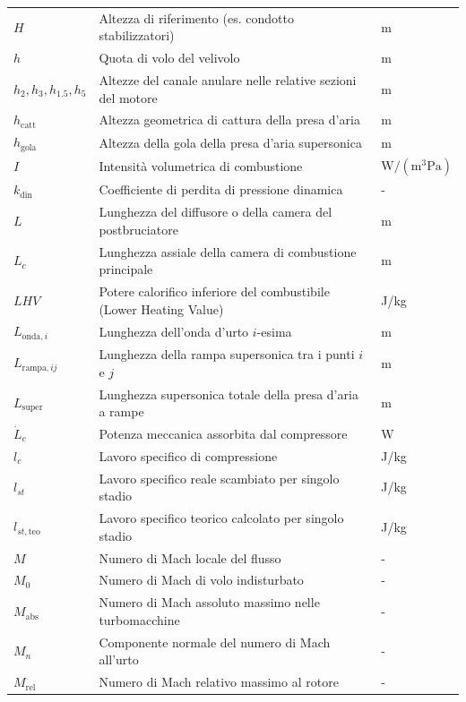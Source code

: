 \begin{longtable}{p{} p{} p{}}
    $H$ & Altezza di riferimento (es. condotto stabilizzatori) & m \\[2px]
    $h$ & Quota di volo del velivolo & m \\[2px]
    $h_2, h_3, h_{1.5}, h_5$ & Altezze del canale anulare nelle relative sezioni del motore & m \\[2px]
    $h_{\text{catt}}$ & Altezza geometrica di cattura della presa d'aria & m \\[2px]
    $h_{\text{gola}}$ & Altezza della gola della presa d'aria supersonica & m \\[2px]
    $I$ & Intensità volumetrica di combustione & $\text{W}/(\text{m}^3 \text{Pa})$ \\[2px]
    $k_{\text{din}}$ & Coefficiente di perdita di pressione dinamica & - \\[2px]
    $L$ & Lunghezza del diffusore o della camera del postbruciatore & m \\[2px]
    $L_c$ & Lunghezza assiale della camera di combustione principale & m \\[2px]
    $LHV$ & Potere calorifico inferiore del combustibile (Lower Heating Value) & J/kg \\[2px]
    $L_{\text{onda},i}$ & Lunghezza dell'onda d'urto $i$-esima & m \\[2px]
    $L_{\text{rampa},ij}$ & Lunghezza della rampa supersonica tra i punti $i$ e $j$ & m \\[2px]
    $L_{\text{super}}$ & Lunghezza supersonica totale della presa d'aria a rampe & m \\[2px]
    $\dot{L}_c$ & Potenza meccanica assorbita dal compressore & W \\[2px]
    $l_c$ & Lavoro specifico di compressione & J/kg \\[2px]
    $l_{st}$ & Lavoro specifico reale scambiato per singolo stadio & J/kg \\[2px]
    $l_{st,\text{teo}}$ & Lavoro specifico teorico calcolato per singolo stadio & J/kg \\[2px]
    $M$ & Numero di Mach locale del flusso & - \\[2px]
    $M_0$ & Numero di Mach di volo indisturbato & - \\[2px]
    $M_{\text{abs}}$ & Numero di Mach assoluto massimo nelle turbomacchine & - \\[2px]
    $M_n$ & Componente normale del numero di Mach all'urto & - \\[2px]
    $M_{\text{rel}}$ & Numero di Mach relativo massimo al rotore & - \\[2px]

\end{longtable}

